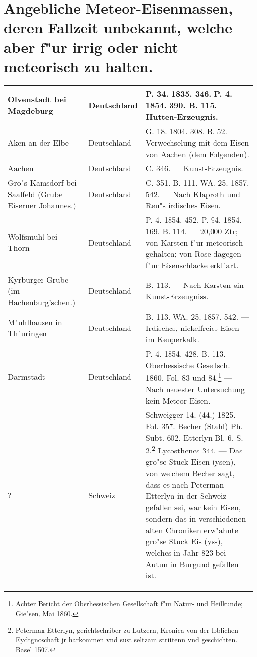 \documentclass[a4paper, 8pt, oneside, polutonikogreek, german]{article}
\begin{document}
\section{Angebliche Meteor-Eisenmassen, deren Fallzeit unbekannt, welche aber f"ur irrig oder nicht meteorisch zu halten.}
\begin{table}[H]
    \centering
    \footnotesize
    \begin{longtable}{|p{40mm}|p{20mm}|p{60mm}|}
    \hline
        Olvenstadt bei Magdeburg & Deutschland & P. 34. 1835. 346. P. 4. 1854. 390. B. 115. --- Hutten-Erzeugnis. \\ \hline
        Aken an der Elbe & Deutschland & G. 18. 1804. 308. B. 52. --- Verwechselung mit dem Eisen von Aachen (dem Folgenden). \\ \hline
        Aachen & Deutschland & C. 346. --- Kunst-Erzeugnis. \\ \hline
        Gro"s-Kamsdorf bei Saalfeld (Grube Eiserner Johannes.) & Deutschland & C. 351. B. 111. WA. 25. 1857. 542. --- Nach Klaproth und Reu"s irdisches Eisen. \\ \hline
        Wolfsmuhl bei Thorn & Deutschland & P. 4. 1854. 452. P. 94. 1854. 169. B. 114. --- 20,000 Ztr; von Karsten f"ur meteorisch gehalten; von Rose dagegen f"ur Eisenschlacke erkl"art. \\ \hline
        Kyrburger Grube (im Hachenburg’schen.) & Deutschland & B. 113. --- Nach Karsten ein Kunst-Erzeugniss. \\ \hline
        M"uhlhausen in Th"uringen & Deutschland & B. 113. WA. 25. 1857. 542. --- Irdisches, nickelfreies Eisen im Keuperkalk. \\ \hline
        Darmstadt & Deutschland & P. 4. 1854. 428. B. 113. Oberhessische Gesellsch. 1860. Fol. 83 und 84.\footnote{Achter Bericht der Oberhessischen Gesellschaft f"ur Natur- und Heilkunde; Gie"sen, Mai 1860.} --- Nach neuester Untersuchung kein Meteor-Eisen. \\ \hline
        ? & Schweiz & Schweigger 14. (44.) 1825. Fol. 357. Becher (Stahl) Ph. Subt. 602. Etterlyn Bl. 6. S. 2.\footnote{Peterman Etterlyn, gerichtschriber zu Lutzern, Kronica von der loblichen Eydtgnoschaft jr harkommen vnd sust seltzam strittenn vnd geschichten. Basel 1507.} Lycosthenes 344. --- Das gro"se Stuck Eisen (ysen), von welchem Becher sagt, dass es nach Peterman Etterlyn in der Schweiz gefallen sei, war kein Eisen, sondern das in verschiedenen alten Chroniken erw"ahnte gro"se Stuck Eis (yss), welches in Jahr 823 bei Autun in Burgund gefallen ist. \\ \hline

\end{longtable}
\end{table}
\end{document}
